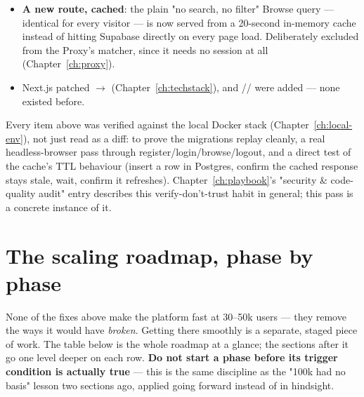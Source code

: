 \begin{itemize}
  \item \textbf{A new  route, cached}: the plain "no search, no filter" Browse query — identical for every visitor — is now served from a 20-second in-memory cache instead of hitting Supabase directly on every page load. Deliberately excluded from the Proxy's matcher, since it needs no session at all (Chapter~\ref{ch:proxy}).
  \item Next.js patched  $\to$  (Chapter~\ref{ch:techstack}), and // were added — none existed before.
\end{itemize}

\begin{olknote}
Every item above was verified against the local Docker stack (Chapter~\ref{ch:local-env}), not just read as a diff:  to prove the migrations replay cleanly, a real headless-browser pass through register/login/browse/logout, and a direct test of the cache's TTL behaviour (insert a row in Postgres, confirm the cached response stays stale, wait, confirm it refreshes). Chapter~\ref{ch:playbook}'s "security \& code-quality audit" entry describes this verify-don't-trust habit in general; this pass is a concrete instance of it.
\end{olknote}

\section{The scaling roadmap, phase by phase}
\label{sec:scaling-roadmap}

None of the fixes above make the platform fast at 30--50k users — they remove the ways it would have \emph{broken}. Getting there smoothly is a separate, staged piece of work. The table below is the whole roadmap at a glance; the sections after it go one level deeper on each row. \textbf{Do not start a phase before its trigger condition is actually true} — this is the same discipline as the "100k had no basis" lesson two sections ago, applied going forward instead of in hindsight.


